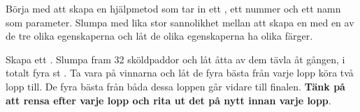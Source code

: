 \Task {}

\Subtask Börja med att skapa en hjälpmetod  som tar in ett , ett nummer och ett namn som parameter. Slumpa med lika stor sannolikhet mellan att skapa en  med en av de tre olika egenskaperna och låt de olika egenskaperna ha olika färger.

\Subtask Skapa ett . Slumpa fram 32 sköldpaddor och låt åtta av dem tävla åt gången, i totalt fyra st   . Ta vara på vinnarna och låt de fyra bästa från varje lopp köra två lopp till. De fyra bästa från båda dessa loppen går vidare till finalen. \textbf{Tänk på att rensa  efter varje lopp och rita ut det på nytt innan varje lopp}.

